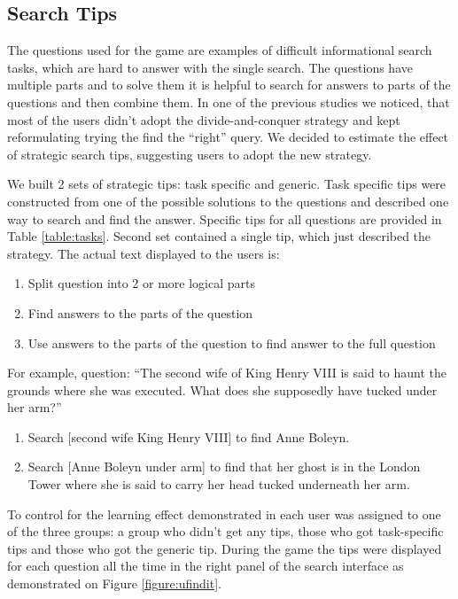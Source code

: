 \documentclass{sig-alternate}
\begin{document}
\subsection{Search Tips}
The questions used for the game are examples of difficult informational search tasks, which are hard to answer with the single search.
The questions have multiple parts and to solve them it is helpful to search for answers to parts of the questions and then combine them.
In one of the previous studies we noticed, that most of the users didn't adopt the divide-and-conquer strategy and kept reformulating trying the find the ``right'' query.
We decided to estimate the effect of strategic search tips, suggesting users to adopt the new strategy.

We built 2 sets of strategic tips: task specific and generic.
Task specific tips were constructed from one of the possible solutions to the questions and described one way to search and find the answer.
Specific tips for all questions are provided in Table \ref{table:tasks}.
Second set contained a single tip, which just described the strategy. The actual text displayed to the users is:
\vspace{-1mm}
\begin{enumerate} \itemsep0pt \parskip0pt 
\item Split question into 2 or more logical parts
\item Find answers to the parts of the question
\item Use answers to the parts of the question to find answer to the full question
\end{enumerate}
\vspace{-2mm}
For example, question: ``The second wife of King Henry VIII is said to haunt the grounds where she was executed. What does she supposedly have tucked under her arm?''
\vspace{-2mm}
\begin{enumerate} \itemsep0pt \parskip0pt 
\item Search [second wife King Henry VIII] to find Anne Boleyn.
\item Search [Anne Boleyn under arm] to find that her ghost is in the London Tower where she is said to carry her head tucked underneath her arm.
\end{enumerate}
\vspace{-2mm}
To control for the learning effect demonstrated in \cite{Moraveji:2011:MIU:2009916.2009966} each user was assigned to one of the three groups: a group who didn't get any tips, those who got task-specific tips and those who got the generic tip.
During the game the tips were displayed for each question all the time in the right panel of the search interface as demonstrated on Figure \ref{figure:ufindit}.
\end{document}
